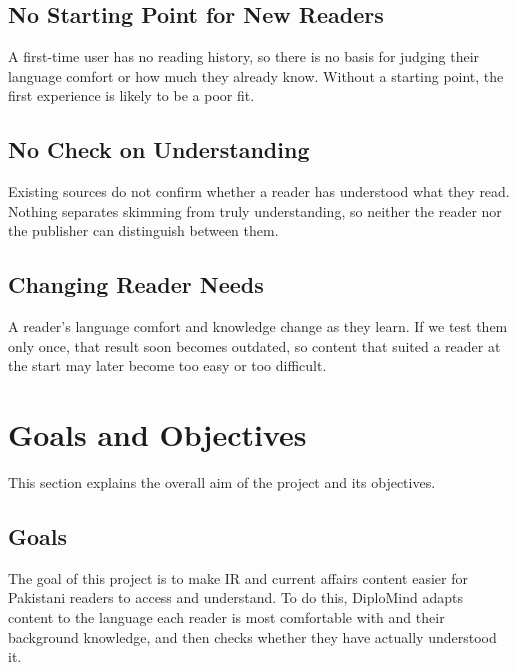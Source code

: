 \documentclass{FastFyp}
\begin{document}
\subsection{No Starting Point for New Readers}
A first-time user has no reading history, so there is no basis for judging their language comfort or how much they already know. Without a starting point, the first experience is likely to be a poor fit.

\subsection{No Check on Understanding}
Existing sources do not confirm whether a reader has understood what they read. Nothing separates skimming from truly understanding, so neither the reader nor the publisher can distinguish between them.

\subsection{Changing Reader Needs}
A reader's language comfort and knowledge change as they learn. If we test them only once, that result soon becomes outdated, so content that suited a reader at the start may later become too easy or too difficult.


\section{Goals and Objectives}
This section explains the overall aim of the project and its objectives.

\subsection{Goals}
The goal of this project is to make IR and current affairs content easier for Pakistani readers to access and understand. To do this, DiploMind adapts content to the language each reader is most comfortable with and their background knowledge, and then checks whether they have actually understood it.
\end{document}
